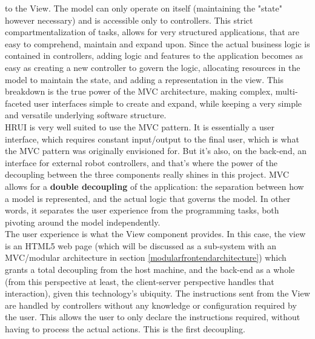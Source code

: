 to the View. The model can only operate on itself (maintaining the "state" however necessary) and is accessible only to 
controllers. This strict compartmentalization of tasks, allows for very structured applications, that are easy to 
comprehend, maintain and expand upon. Since the actual business logic is contained in controllers, adding logic and 
features to the application becomes as easy as creating a new controller to govern the logic, allocating resources in the 
model to maintain the state, and adding a representation in the view. This breakdown is the true power of the MVC 
architecture, making complex, multi-faceted user interfaces simple to create and expand, while keeping a very simple and 
versatile underlying software structure.\\

HRUI is very well suited to use the MVC pattern. It is essentially a user interface, which requires constant input/output 
to the final user, which is what the MVC pattern was originally envisioned for. But it's also, on the back-end, an 
interface for external robot controllers, and that's where the power of the decoupling between the three components really 
shines in this project. MVC allows for a \textbf{double decoupling} of the application: the separation between how a model 
is represented, and the actual logic that governs the model. In other words, it separates the user experience from the 
programming tasks, both pivoting around the model independently.\\

The user experience is what the View component provides. In this case, the view is an HTML5 web page (which will be 
discussed as a sub-system with an MVC/modular architecture in section \ref{modularfrontendarchitecture}) which grants a 
total decoupling from the host machine, and the back-end as a whole (from this perspective at least, the client-server 
perspective handles that interaction), given this technology's ubiquity. The instructions sent from the View are handled by 
controllers without any knowledge or configuration required by the user. This allows the user to only declare the 
instructions required, without having to process the actual actions. This is the first decoupling.\\

